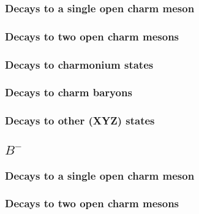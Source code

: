\subsubsection{Decays to a single open charm meson}




\subsubsection{Decays to two open charm mesons}




\subsubsection{Decays to charmonium states}




\subsubsection{Decays to charm baryons}




\subsubsection{Decays to other (XYZ) states}






\subsection{$B^-$}

\subsubsection{Decays to a single open charm meson}















\subsubsection{Decays to two open charm mesons}




